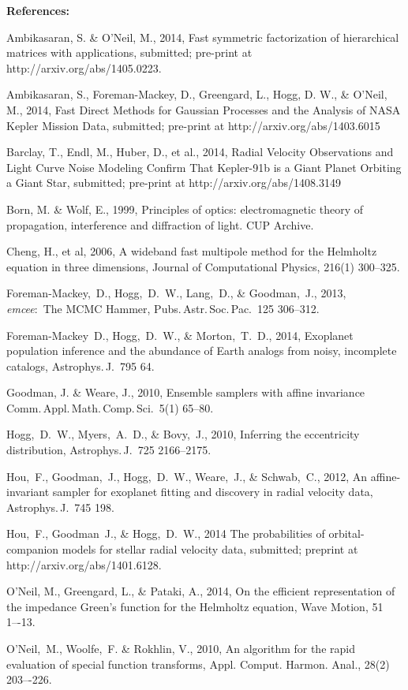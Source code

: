 \documentclass[11pt]{article}
\renewcommand{\paragraph}[1]{\smallskip\par\noindent\textbf{{#1}:}}
\begin{document}
\paragraph{References}
\begin{trivlist}\raggedright
\item
Ambikasaran, S. \& O'Neil, M., 2014,
Fast symmetric factorization of hierarchical matrices with applications,
submitted; pre-print at http://arxiv.org/abs/1405.0223.
\item
Ambikasaran, S., Foreman-Mackey, D., Greengard, L., Hogg, D. W., \& O'Neil, M., 2014,
Fast Direct Methods for Gaussian Processes and the Analysis of NASA Kepler Mission Data,
submitted; pre-print at http://arxiv.org/abs/1403.6015
\item
Barclay, T., Endl, M., Huber, D., et al., 2014,
Radial Velocity Observations and Light Curve Noise Modeling Confirm That Kepler-91b is a Giant Planet Orbiting a Giant Star,
submitted; pre-print at http://arxiv.org/abs/1408.3149
\item
Born, M. \& Wolf, E., 1999,
Principles of optics: electromagnetic theory of propagation, interference and diffraction of light.
CUP Archive.
\item
Cheng, H., et al, 2006,
A wideband fast multipole method for the Helmholtz equation in three dimensions,
Journal of Computational Physics, 216(1) 300--325.
\item
Foreman-Mackey,~D., Hogg,~D.~W., Lang,~D., \& Goodman,~J., 2013,
\textsl{emcee}:\ The MCMC Hammer,
{Pubs.\,Astr.\,Soc.\,Pac.}\ {125} 306--312.
\item
Foreman-Mackey~D., Hogg,~D.~W., \& Morton,~T.~D., 2014,
{Exoplanet population inference and the abundance of Earth analogs from noisy, incomplete catalogs},
{Astrophys.\,J.}\ {795} 64.
\item
Goodman, J. \& Weare, J., 2010,
Ensemble samplers with affine invariance
Comm.\,Appl.\,Math.\,Comp.\,Sci.\ 5(1) 65--80.
\item
Hogg,~D.~W., Myers,~A.~D., \& Bovy,~J., 2010,
{Inferring the eccentricity distribution},
{Astrophys.\,J.}\ {725} 2166--2175.
\item
Hou,~F., Goodman,~J., Hogg,~D.~W., Weare,~J., \& Schwab,~C., 2012,
{An affine-invariant sampler for exoplanet fitting and discovery in radial velocity data},
{Astrophys.\,J.}\ {745} 198.
\item
Hou,~F., Goodman~J., \& Hogg,~D.~W., 2014
{The probabilities of orbital-companion models for stellar radial velocity data},
submitted; preprint at http://arxiv.org/abs/1401.6128.
\item
O'Neil, M., Greengard, L., \& Pataki, A., 2014,
On the efficient representation of the impedance Green’s function for the Helmholtz equation,
Wave Motion, 51 1–-13. 
\item
O'Neil,~M., Woolfe,~F. \& Rokhlin, V., 2010,
An algorithm for the rapid evaluation of special function transforms,
Appl. Comput. Harmon. Anal., 28(2) 203–-226. 
\end{trivlist}
\end{document}
